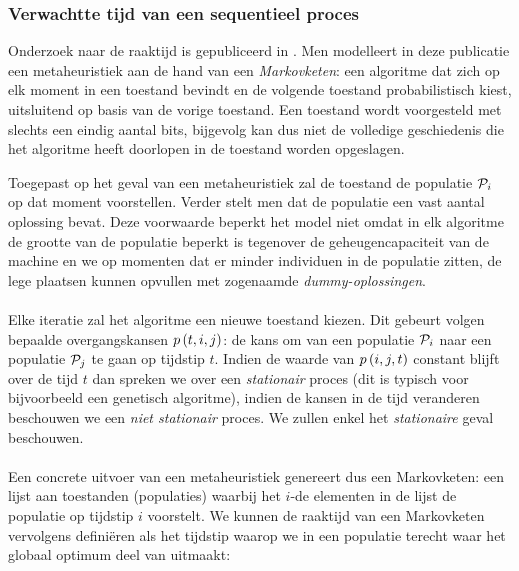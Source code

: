 \subsubsection{Verwachtte tijd van een sequentieel proces}

Onderzoek naar de raaktijd is gepubliceerd in \cite{DBLP:journals/jc/ShonkwilerV94}. Men modelleert in deze publicatie een metaheuristiek aan de hand van een \emph{Markovketen}: een algoritme dat zich op elk moment in een toestand bevindt en de volgende toestand probabilistisch kiest, uitsluitend op basis van de vorige toestand. Een toestand wordt voorgesteld met slechts een eindig aantal bits, bijgevolg kan dus niet de volledige geschiedenis die het algoritme heeft doorlopen in de toestand worden opgeslagen.

Toegepast op het geval van een metaheuristiek zal de toestand de populatie $\mathcal{P}_i$ op dat moment voorstellen. Verder stelt men dat de populatie een vast aantal oplossing bevat. Deze voorwaarde beperkt het model niet omdat in elk algoritme de grootte van de populatie beperkt is tegenover de geheugencapaciteit van de machine en we op momenten dat er minder individuen in de populatie zitten, de lege plaatsen kunnen opvullen met zogenaamde \emph{dummy-oplossingen}.
\paragraph{}
Elke iteratie zal het algoritme een nieuwe toestand kiezen. Dit gebeurt volgen bepaalde overgangskansen $p\left(t,i,j\right)$: de kans om van een populatie $\mathcal{P}_i$ naar een populatie $\mathcal{P}_j$ te gaan op tijdstip $t$. Indien de waarde van $p\left(i,j,t\right)$ constant blijft over de tijd $t$ dan spreken we over een \emph{stationair} proces (dit is typisch voor bijvoorbeeld een genetisch algoritme), indien de kansen in de tijd veranderen beschouwen we een \emph{niet stationair} proces. We zullen enkel het \emph{stationaire} geval beschouwen.

\paragraph{}
Een concrete uitvoer van een metaheuristiek genereert dus een Markovketen: een lijst aan toestanden (populaties) waarbij het $i$-de elementen in de lijst de populatie op tijdstip $i$ voorstelt. We kunnen de raaktijd van een Markovketen vervolgens defini\"eren als het tijdstip waarop we in een populatie terecht waar het globaal optimum deel van uitmaakt:

